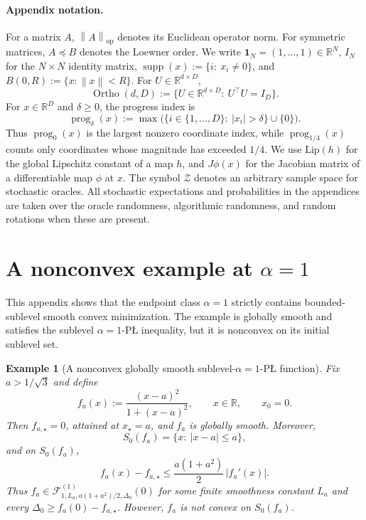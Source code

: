 \documentclass[11pt]{article}
\newtheorem{example}[theorem]{Example}
\newcommand{\R}{\mathbb{R}}
\newcommand{\norm}[1]{\left\lVert #1\right\rVert}
\newcommand{\abs}[1]{\left\lvert #1\right\rvert}
\newcommand{\supp}{\operatorname{supp}}
\newcommand{\prog}{\operatorname{prog}}
\newcommand{\Ortho}{\operatorname{Ortho}}
\newcommand{\one}{\mathbf{1}}
\begin{document}
\paragraph{Appendix notation.}
For a matrix \(A\), \(\norm{A}_{\mathrm{op}}\) denotes its Euclidean operator norm. For symmetric matrices, \(A\preceq B\)
denotes the Loewner order. We write \(\one_N=(1,\ldots,1)\in\R^N\), \(I_N\) for the \(N\times N\) identity matrix,
\(\supp(x):=\{i:\ x_i\ne0\}\), and \(B(0,R):=\{x:\norm{x}<R\}\). For \(U\in\R^{d\times D}\),
\[
\Ortho(d,D):=\{U\in\R^{d\times D}:\ U^\top U=I_D\}.
\]
For \(x\in\R^D\) and \(\delta\ge0\), the progress index is
\[
\prog_\delta(x):=\max\bigl(\{i\in\{1,\ldots,D\}:\ |x_i|>\delta\}\cup\{0\}\bigr).
\]
Thus \(\prog_0(x)\) is the largest nonzero coordinate index, while \(\prog_{1/4}(x)\) counts only coordinates whose
magnitude has exceeded \(1/4\). We use \(\mathrm{Lip}(h)\) for the global Lipschitz constant of a map \(h\), and
\(J\phi(x)\) for the Jacobian matrix of a differentiable map \(\phi\) at \(x\). The symbol \(\mathcal Z\) denotes an
arbitrary sample space for stochastic oracles. All stochastic expectations and probabilities in the appendices are taken
over the oracle randomness, algorithmic randomness, and random rotations when these are present.

\section{A nonconvex example at \texorpdfstring{\(\alpha=1\)}{alpha=1}}
\label{app:nonconvex-alpha1}

This appendix shows that the endpoint class \(\alpha=1\) strictly contains bounded-sublevel smooth convex
minimization. The example is globally smooth and satisfies the sublevel \(\alpha=1\)-P\L{} inequality, but it is nonconvex
on its initial sublevel set.

\begin{example}[A nonconvex globally smooth sublevel-\(\alpha=1\)-P\L{} function]
\label{ex:nonconvex-alpha1}
Fix \(a>1/\sqrt 3\) and define
\[
f_a(x):=\frac{(x-a)^2}{1+(x-a)^2},
\qquad x\in\R,
\qquad x_0=0.
\]
Then \(f_{a,\star}=0\), attained at \(x_\star=a\), and \(f_a\) is globally smooth. Moreover,
\[
S_0(f_a)=\{x:\ |x-a|\le a\},
\]
and on \(S_0(f_a)\),
\[
f_a(x)-f_{a,\star}
\le
\frac{a(1+a^2)}{2}\,\abs{f_a'(x)} .
\]
Thus \(f_a\in\mathcal F^{(1)}_{1,L_a,a(1+a^2)/2,\Delta_0}(0)\) for some finite smoothness constant \(L_a\) and every
\(\Delta_0\ge f_a(0)-f_{a,\star}\). However, \(f_a\) is not convex on \(S_0(f_a)\).
\end{example}
\end{document}
